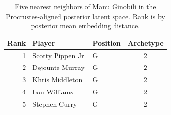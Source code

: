 \begin{table}[htbp]
  \centering\small
  \begin{tabular}{rllc}
    \toprule
    Rank & Player & Position & Archetype \\
    \midrule
    1 & Scotty Pippen Jr. & G & 2 \\
    2 & Dejounte Murray & G & 2 \\
    3 & Khris Middleton & G & 2 \\
    4 & Lou Williams & G & 2 \\
    5 & Stephen Curry & G & 2 \\
    \bottomrule
  \end{tabular}
  \caption{Five nearest neighbors of Manu Ginobili in the Procrustes-aligned posterior latent space. Rank is by posterior mean embedding distance.}
  \label{tab:Manu_Ginobili_neighbors}
\end{table}

